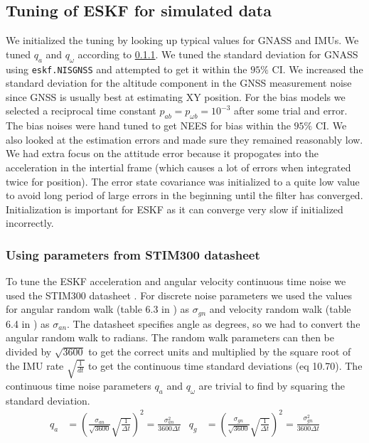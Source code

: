 \subsection{Tuning of ESKF for simulated data}
We initialized the tuning by looking up typical values for GNASS and IMUs. We tuned $q_a$ and $q_\omega$ according to \cref{sec:using_datasheet}. We tuned the standard deviation for GNASS using \texttt{eskf.NISGNSS} and attempted to get it within the $95\%$ CI. We increased the standard deviation for the altitude component in the GNSS measurement noise since GNSS is usually best at estimating XY position. For the bias models we selected a reciprocal time constant $p_{ab} = p_{\omega b} = 10^{-3}$ after some trial and error. The bias noises were hand tuned to get NEES for bias within the $95\%$ CI. We also looked at the estimation errors and made sure they remained reasonably low. We had extra focus on the attitude error because it propogates into the acceleration in the intertial frame (which causes a lot of errors when integrated twice for position). The error state covariance was initialized to a quite low value to avoid long period of large errors in the beginning until the filter has converged. Initialization is important for ESKF as it can  converge very slow if initialized incorrectly.

\subsubsection{Using parameters from STIM300 datasheet}\label{sec:using_datasheet}
To tune the ESKF acceleration and angular velocity continuous time noise we used the STIM300 datasheet \cite{stim300}. For discrete noise parameters we used the values for angular random walk (table 6.3 in \cite{stim300}) as $\sigma_{gn}$ and velocity random walk (table 6.4 in \cite{stim300}) as $\sigma_{an}$.
The datasheet specifies angle as degrees, so we had to convert the angular random walk to radians.
The random walk parameters can then be divided by $\sqrt{3600}$ to get the correct units and multiplied by the square root of the IMU rate $\sqrt{\frac{1}{dt}}$ to get the continuous time standard deviations (eq 10.70\cite{edmund}). The continuous time noise parameters $q_a$ and $q_\omega$ are trivial to find by squaring the standard deviation.
\begin{align}
q_a &= (\frac{\sigma_{an}}{\sqrt{3600}} \sqrt{\frac{1}{\Delta t}})^2 = \frac{\sigma_{an}^2}{3600 \Delta t} & q_g &= (\frac{\sigma_{gn}}{\sqrt{3600}}\sqrt{\frac{1}{\Delta t}})^2 = \frac{\sigma_{gn}^2}{3600 \Delta t} \label{eq:eskf-cont-noise}
\end{align}

